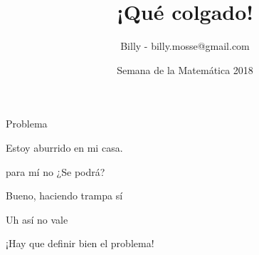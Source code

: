\documentclass[11pt]{beamer}
\begin{document}
\title{¡Qué colgado!}
\date{Semana de la Matemática 2018}
\author{Billy - billy.mosse@gmail.com}


\begin{frame}
\maketitle
\end{frame}


\begin{frame}{Problema}

	Estoy aburrido en mi casa.
	\bigskip
	
	\bigskip
	
	\bigskip
	
	
\end{frame}

\begin{frame}{para mí no}
	\huge{¿Se podrá?}
\end{frame}


\begin{frame}{Bueno, haciendo trampa sí}
	
\end{frame}

\begin{frame}{Uh así no vale}


\huge{¡Hay que definir bien el problema!}

\end{frame}
\end{document}
